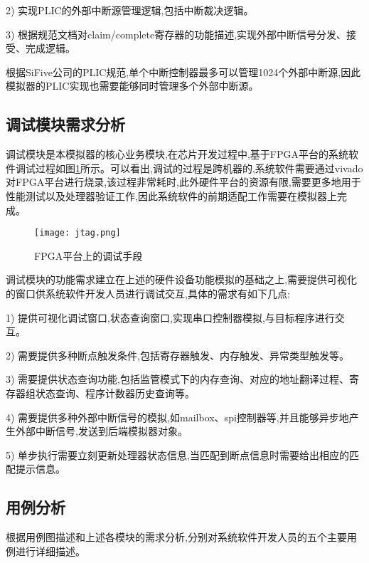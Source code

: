 2) 实现PLIC的外部中断源管理逻辑,包括中断裁决逻辑。


3) 根据规范文档对claim/complete寄存器的功能描述,实现外部中断信号分发、接受、完成逻辑。


根据SiFive公司的PLIC规范,单个中断控制器最多可以管理1024个外部中断源,因此模拟器的PLIC实现也需要能够同时管理多个外部中断源。


\subsection{调试模块需求分析}
调试模块是本模拟器的核心业务模块,在芯片开发过程中,基于FPGA平台的系统软件调试过程如图\ref{fig:jtag}所示。可以看出,调试的过程是跨机器的,系统软件需要通过vivado对FPGA平台进行烧录,该过程非常耗时,此外硬件平台的资源有限,需要更多地用于性能测试以及处理器验证工作,因此系统软件的前期适配工作需要在模拟器上完成。

\begin{figure}[H]
  \centering
  \texttt{[image: jtag.png]}
  \caption{FPGA平台上的调试手段}
  \label{fig:jtag}
\end{figure}

调试模块的功能需求建立在上述的硬件设备功能模拟的基础之上,需要提供可视化的窗口供系统软件开发人员进行调试交互,具体的需求有如下几点:


1) 提供可视化调试窗口,状态查询窗口,实现串口控制器模拟,与目标程序进行交互。


2) 需要提供多种断点触发条件,包括寄存器触发、内存触发、异常类型触发等。


3) 需要提供状态查询功能,包括监管模式下的内存查询、对应的地址翻译过程、寄存器组状态查询、程序计数器历史查询等。


4) 需要提供多种外部中断信号的模拟,如mailbox、spi控制器等,并且能够异步地产生外部中断信号,发送到后端模拟器对象。


5) 单步执行需要立刻更新处理器状态信息,当匹配到断点信息时需要给出相应的匹配提示信息。

\subsection{用例分析}

根据用例图描述和上述各模块的需求分析,分别对系统软件开发人员的五个主要用例进行详细描述。 


